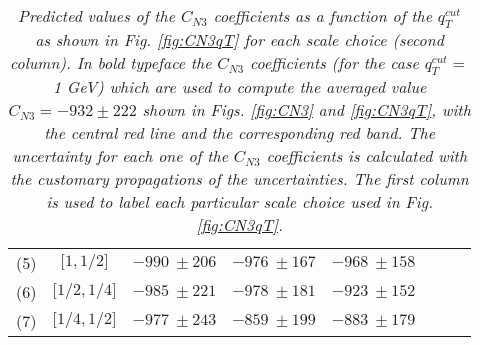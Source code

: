 \documentclass[12pt]{article}
\begin{document}
\begin{table}
\begin{tabular}{ |c|c||c|c|c|c|c|c| }
\multirow{1}{*}{(5)} 

& $\big[1,1/2 \big]$

& $ -990~\pm 206$ %

& $ -976~\pm 167$%

& $ -968~\pm 158$%

 \\
 
\multirow{1}{*}{(6)} 

& $ \big[1/2,1/4 \big]$

& $ -985~\pm 221$ %

& $ -978~\pm 181$%

& $-923~\pm 152$%

\\

\multirow{1}{*}{(7)} 

& $\big[1/4,1/2 \big]$

& $ -977~\pm 243$ %

& $ -859~\pm 199$%

& $ -883~\pm 179$%
\\

\hline

\end{tabular}

\caption{\label{Table:CN3values}
{\em Predicted values of the $C_{N3}$ coefficients as a function of the $q^{cut}_{T}$ as shown in Fig. \ref{fig:CN3qT} for each scale choice (second column). In bold typeface the $C_{N3}$ coefficients (for the case $q^{cut}_{T}=$1 GeV) which are used to compute the averaged value $C_{N3}=-932\pm 222$ shown in Figs. \ref{fig:CN3} and \ref{fig:CN3qT}, with the central red line and the corresponding red band. The uncertainty for each one of the $C_{N3}$ coefficients is calculated with the customary propagations of the uncertainties. The first column is used to label each particular scale choice used in Fig. \ref{fig:CN3qT}.
}
}
\renewcommand{\arraystretch}{1}

\end{table}
\end{document}
